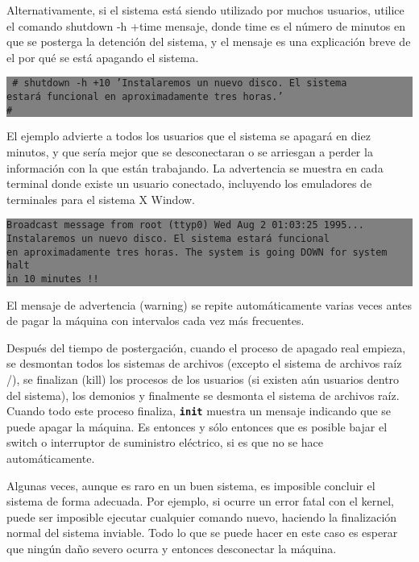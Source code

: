 \documentclass[12pt]{article}
\begin{document}
 Alternativamente, si el sistema está siendo utilizado por muchos
usuarios, utilice el comando shutdown -h +time mensaje, donde time es el número
de minutos en que se posterga la detención del sistema, y el mensaje es una
explicación breve de el por qué se está apagando el sistema.

\colorbox{grey}{\parbox[t]{0.95\linewidth}{ \vspace*{0.5cm} 
{\tt
\# shutdown -h +10 'Instalaremos un nuevo disco. El sistema  \\
estará funcional en aproximadamente tres horas.' \\
\#
} \vspace*{0.5cm} } } 

El ejemplo advierte a todos los usuarios que el sistema se apagará en diez
minutos, y que sería mejor que se desconectaran o se arriesgan a perder la
información con la que están trabajando. La advertencia se muestra en cada
terminal donde existe un usuario conectado, incluyendo los emuladores de
terminales para el sistema X Window. 



\colorbox{grey}{\parbox[t]{0.95\linewidth}{ \vspace*{0.5cm} 
{\tt  Broadcast message from root (ttyp0) Wed Aug  2 01:03:25 1995... \\
Instalaremos un nuevo disco. El sistema estará funcional \\
en aproximadamente tres horas.  The system is going DOWN for system halt \\
in 10 minutes !!   } \vspace*{0.5cm} } } 


El mensaje de advertencia (warning)
se repite automáticamente varias veces antes de pagar la máquina con
intervalos cada vez más frecuentes.

 Después del tiempo de postergación, cuando el proceso de apagado real
empieza, se desmontan todos los sistemas de archivos (excepto el sistema de
archivos raíz /), se finalizan (kill) los procesos de los usuarios (si existen
aún usuarios dentro del sistema), los demonios y finalmente se desmonta el
sistema de archivos raíz. Cuando todo este proceso finaliza,
\texttt{\textbf{init}} muestra un mensaje indicando que se puede apagar la
máquina. Es entonces y sólo entonces que es posible bajar el switch o
interruptor de suministro eléctrico, si es que no se hace automáticamente.

 Algunas veces, aunque es raro en un buen sistema, es imposible concluir
el sistema de forma adecuada. Por ejemplo, si ocurre un error fatal con el
kernel, puede ser imposible ejecutar cualquier comando nuevo, haciendo la
finalización normal del sistema inviable. Todo lo que se puede hacer en este
caso es esperar que ningún daño severo ocurra y entonces desconectar la máquina.
\end{document}
